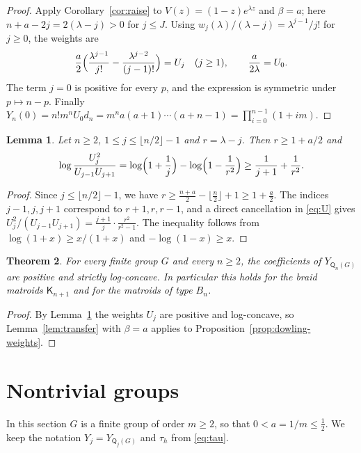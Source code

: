 \documentclass[11pt]{amsart}
\newtheorem{theorem}{Theorem}[section]
\newtheorem{lemma}[theorem]{Lemma}
\theoremstyle{definition}
\theoremstyle{remark}
\numberwithin{equation}{section}
\newcommand{\Q}{\mathsf{Q}}
\newcommand{\K}{\mathsf{K}}
\begin{document}
\begin{proof}
Apply Corollary~\ref{cor:raise} to $V(z)=(1-z)e^{\lambda z}$ and $\beta=a$; here $n+a-2j=2(\lambda-j)>0$ for $j\le J$. Using $w_j(\lambda)/(\lambda-j)=\lambda^{j-1}/j!$ for $j\ge0$, the weights are
\[
\frac a2\Bigl(\frac{\lambda^{j-1}}{j!}-\frac{\lambda^{j-2}}{(j-1)!}\Bigr)=U_j\quad(j\ge1),\qquad\frac{a}{2\lambda}=U_0.
\]
The term $j=0$ is positive for every $p$, and the expression is symmetric under $p\mapsto n-p$. Finally $Y_n(0)=n!m^nU_0d_n=m^na(a+1)\cdots(a+n-1)=\prod_{i=0}^{n-1}(1+im)$.
\end{proof}

\begin{lemma}\label{lem:U}
Let $n\ge2$, $1\le j\le\lfloor n/2\rfloor-1$ and $r=\lambda-j$. Then $r\ge1+a/2$ and
\[
\log\frac{U_j^2}{U_{j-1}U_{j+1}}=\log\Bigl(1+\frac1j\Bigr)-\log\Bigl(1-\frac1{r^2}\Bigr)\ge\frac1{j+1}+\frac1{r^2}.
\]
\end{lemma}

\begin{proof}
Since $j\le\lfloor n/2\rfloor-1$, we have $r\ge\frac{n+a}2-\lfloor\frac n2\rfloor+1\ge1+\frac a2$. The indices $j-1,j,j+1$ correspond to $r+1,r,r-1$, and a direct cancellation in \eqref{eq:U} gives $U_j^2/(U_{j-1}U_{j+1})=\frac{j+1}{j}\cdot\frac{r^2}{r^2-1}$. The inequality follows from $\log(1+x)\ge x/(1+x)$ and $-\log(1-x)\ge x$.
\end{proof}

\begin{theorem}\label{thm:dowling-lc}
For every finite group $G$ and every $n\ge2$, the coefficients of $Y_{\Q_n(G)}$ are positive and strictly log-concave. In particular this holds for the braid matroids $\K_{n+1}$ and for the matroids of type $B_n$.
\end{theorem}

\begin{proof}
By Lemma~\ref{lem:U} the weights $U_j$ are positive and log-concave, so Lemma~\ref{lem:transfer} with $\beta=a$ applies to Proposition~\ref{prop:dowling-weights}.
\end{proof}

\section{Nontrivial groups}\label{sec:nontrivial}

In this section $G$ is a finite group of order $m\ge2$, so that $0<a=1/m\le\frac12$. We keep the notation $Y_j=Y_{\Q_j(G)}$ and $\tau_h$ from \eqref{eq:tau}.
\end{document}
